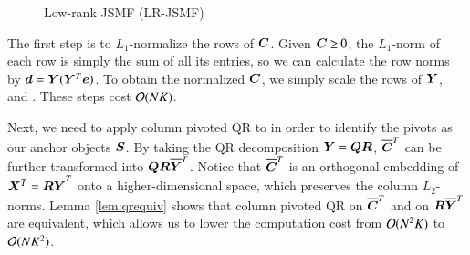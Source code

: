 \begin{figure}[htbp]
\begin{algorithm}[H]
		\caption{Low-rank JSMF (LR-JSMF)}
	\label{alg:lr-jsmf}        
	\end{algorithm}
\end{figure}

The first step is to $L_1$\hyp{}normalize the rows of $\bm{C}$. Given $\bm{C} \mathbin{\geq} 0$,
the $L_1$\hyp{}norm of each row is simply the sum of all its entries, so we can
calculate the row norms by $\bm{d} \mathrel{=} \bm{Y}(\bm{Y}^T\bm{e})$. To obtain the normalized
$\bm{C}$, we simply scale the rows of $\bm{Y}$, and . These steps cost $\mathcal{O}(NK)$.

Next, we need to apply column pivoted QR to  in order to
identify the pivots as our anchor objects $\bm{S}$. By taking the QR decomposition
$\bm{Y} \mathrel{=} \bm{Q}\bm{R}$, $\overline{\bm{C}}^T$ can be further transformed into $\bm{Q}\bm{R}\overline{\bm{Y}}^T$.
Notice that $\overline{\bm{C}}^T$ is an orthogonal embedding of $\bm{X}^T = \bm{R}\overline{\bm{Y}}^T$ onto
a higher-dimensional space, which preserves the column $L_2$-norms. Lemma 
\ref{lem:qrequiv} shows that column pivoted QR on $\overline{\bm{C}}^T$ and on
$\bm{R}\overline{\bm{Y}}^T$ are equivalent, which allows us to lower the computation cost from
$\mathcal{O}(N^2K)$ to $\mathcal{O}(NK^2)$.

